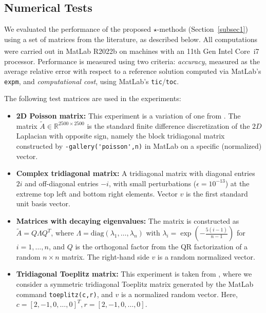 \documentclass[final,1p,times,number]{elsarticle}
\theoremstyle{plain}%
\begin{document}
\subsection{Numerical Tests}
We evaluated the performance of the proposed $\star$-methods (Section~\ref{subsec1}) using a set of matrices from the literature, as described below. All computations were carried out in MatLab R2022b on machines with an 11th Gen Intel\textsuperscript{\textregistered} Core\texttrademark~i7 processor. Performance is measured using two criteria: \emph{accuracy}, measured as the average relative error with respect to a reference solution computed via MatLab's \texttt{expm}, and \emph{computational cost}, using MatLab's \texttt{tic}/\texttt{toc}. 

The following test matrices are used in the experiments:
\begin{itemize}
\item \textbf{2D Poisson matrix:} 
This experiment is a variation of one from \cite{al2011computing, trefethen2006talbot}. The matrix \(\tilde{A}\in\mathbb{R}^{2500\times 2500}\) is the standard finite difference discretization of the $2D$ Laplacian with opposite sign, namely the block tridiagonal matrix constructed by \verb|-gallery('poisson',n)| in MatLab on a specific (normalized) vector.

\item \textbf{Complex tridiagonal matrix:} A tridiagonal matrix with diagonal entries $2i$ and off-diagonal entries $-i$, with small perturbations ($\epsilon = 10^{-13}$) at the extreme top left and bottom right elements. Vector $v$ is the first standard unit basis vector.

\item \textbf{Matrices with decaying eigenvalues:}
The matrix is constructed as $\tilde{A} = Q\Lambda Q^T$, where 
$\Lambda = \mathrm{diag}(\lambda_1, \ldots, \lambda_n)$ with 
$\lambda_i = \exp\!\left(-\frac{5(i-1)}{n-1}\right)$ for $i = 1, \ldots, n$, 
and $Q$ is the orthogonal factor from the QR factorization of a random $n\times n$ matrix. 
The right-hand side $v$ is a random normalized vector.
    
\item \textbf{Tridiagonal Toeplitz matrix:} This experiment is taken from \cite{strang2014functions}, where we consider a symmetric tridiagonal Toeplitz matrix generated by the MatLab command \verb|toeplitz(c,r)|, and $v$ is a normalized random vector. Here, 
$c = [2, -1, 0, \dots, 0]^{T}, r = [2, -1, 0,\dots, 0].$


\end{itemize}
\end{document}
